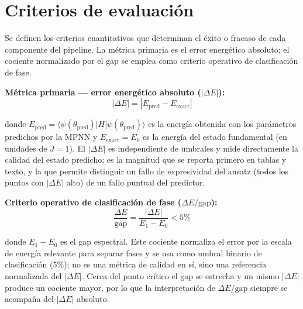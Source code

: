 \documentclass[11pt,a4paper,spanish]{book}
\begin{document}
\section{Criterios de evaluación}

Se definen los criterios cuantitativos que determinan el éxito o fracaso de cada componente del pipeline. La métrica primaria es el error energético absoluto; el cociente normalizado por el gap se emplea como criterio operativo de clasificación de fase.

\textbf{Métrica primaria --- error energético absoluto ($|\Delta E|$):}
\begin{equation}
|\Delta E| = |E_{\text{pred}} - E_{\text{exact}}|
\label{eq:abs_error}
\end{equation}

\noindent donde $E_{\text{pred}} = \langle \psi(\theta_{\text{pred}}) | H | \psi(\theta_{\text{pred}}) \rangle$ es la energía obtenida con los parámetros predichos por la MPNN y $E_{\text{exact}} = E_0$ es la energía del estado fundamental (en unidades de $J = 1$). El $|\Delta E|$ es independiente de umbrales y mide directamente la calidad del estado predicho; es la magnitud que se reporta primero en tablas y texto, y la que permite distinguir un fallo de expresividad del ansatz (todos los puntos con $|\Delta E|$ alto) de un fallo puntual del predictor.

\textbf{Criterio operativo de clasificación de fase ($\Delta E/\text{gap}$):}
\begin{equation}
\frac{\Delta E}{\text{gap}} = \frac{|\Delta E|}{E_1 - E_0} < 5\%
\label{eq:de_gap}
\end{equation}

\noindent donde $E_1 - E_0$ es el gap espectral. Este cociente normaliza el error por la escala de energía relevante para separar fases y se usa como umbral binario de clasificación (5\%); no es una métrica de calidad en sí, sino una referencia normalizada del $|\Delta E|$. Cerca del punto crítico el gap se estrecha y un mismo $|\Delta E|$ produce un cociente mayor, por lo que la interpretación de $\Delta E/\text{gap}$ siempre se acompaña del $|\Delta E|$ absoluto.
\end{document}
